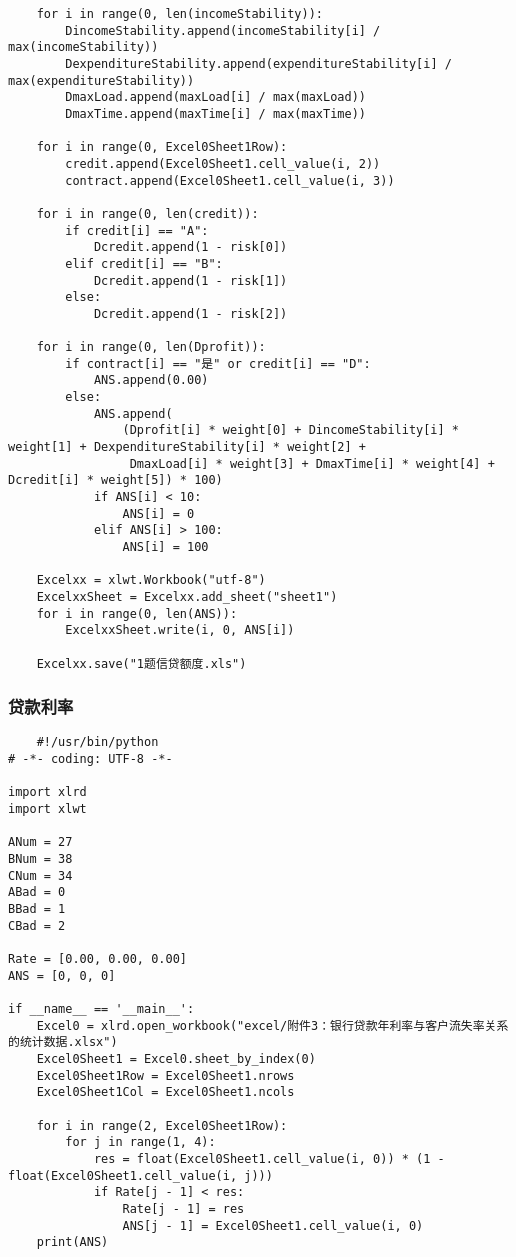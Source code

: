 \documentclass[dvipsnames,withoutpreface,bwprint]{cumcmthesis}
\begin{document}
\begin{appendices}
\begin{lstlisting}
    for i in range(0, len(incomeStability)):
        DincomeStability.append(incomeStability[i] / max(incomeStability))
        DexpenditureStability.append(expenditureStability[i] / max(expenditureStability))
        DmaxLoad.append(maxLoad[i] / max(maxLoad))
        DmaxTime.append(maxTime[i] / max(maxTime))

    for i in range(0, Excel0Sheet1Row):
        credit.append(Excel0Sheet1.cell_value(i, 2))
        contract.append(Excel0Sheet1.cell_value(i, 3))

    for i in range(0, len(credit)):
        if credit[i] == "A":
            Dcredit.append(1 - risk[0])
        elif credit[i] == "B":
            Dcredit.append(1 - risk[1])
        else:
            Dcredit.append(1 - risk[2])

    for i in range(0, len(Dprofit)):
        if contract[i] == "是" or credit[i] == "D":
            ANS.append(0.00)
        else:
            ANS.append(
                (Dprofit[i] * weight[0] + DincomeStability[i] * weight[1] + DexpenditureStability[i] * weight[2] +
                 DmaxLoad[i] * weight[3] + DmaxTime[i] * weight[4] + Dcredit[i] * weight[5]) * 100)
            if ANS[i] < 10:
                ANS[i] = 0
            elif ANS[i] > 100:
                ANS[i] = 100

    Excelxx = xlwt.Workbook("utf-8")
    ExcelxxSheet = Excelxx.add_sheet("sheet1")
    for i in range(0, len(ANS)):
        ExcelxxSheet.write(i, 0, ANS[i])

    Excelxx.save("1题信贷额度.xls")
\end{lstlisting}
\subsubsection{贷款利率}
\begin{lstlisting}
    #!/usr/bin/python
# -*- coding: UTF-8 -*-

import xlrd
import xlwt

ANum = 27
BNum = 38
CNum = 34
ABad = 0
BBad = 1
CBad = 2

Rate = [0.00, 0.00, 0.00]
ANS = [0, 0, 0]

if __name__ == '__main__':
    Excel0 = xlrd.open_workbook("excel/附件3：银行贷款年利率与客户流失率关系的统计数据.xlsx")
    Excel0Sheet1 = Excel0.sheet_by_index(0)
    Excel0Sheet1Row = Excel0Sheet1.nrows
    Excel0Sheet1Col = Excel0Sheet1.ncols

    for i in range(2, Excel0Sheet1Row):
        for j in range(1, 4):
            res = float(Excel0Sheet1.cell_value(i, 0)) * (1 - float(Excel0Sheet1.cell_value(i, j)))
            if Rate[j - 1] < res:
                Rate[j - 1] = res
                ANS[j - 1] = Excel0Sheet1.cell_value(i, 0)
    print(ANS)
\end{lstlisting}

\end{appendices}
\end{document}
